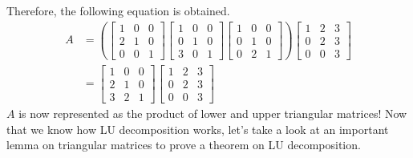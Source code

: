 \documentclass[../main.tex]{subfiles}
\begin{document}
Therefore, the following equation is obtained.
\begin{align*}
    A
    &=
    \left(
    \begin{bmatrix}
        1 & 0 & 0 \\
        2 & 1 & 0 \\
        0 & 0 & 1
    \end{bmatrix}
    \begin{bmatrix}
        1 & 0 & 0 \\
        0 & 1 & 0 \\
        3 & 0 & 1
    \end{bmatrix}
    \begin{bmatrix}
        1 & 0 & 0 \\
        0 & 1 & 0 \\
        0 & 2 & 1
    \end{bmatrix}
    \right)
    \begin{bmatrix}
        1 & 2 & 3 \\
        0 & 2 & 3 \\
        0 & 0 & 3
    \end{bmatrix} \\
    &=
    \begin{bmatrix}
        1 & 0 & 0 \\
        2 & 1 & 0 \\
        3 & 2 & 1
    \end{bmatrix}
    \begin{bmatrix}
        1 & 2 & 3 \\
        0 & 2 & 3 \\
        0 & 0 & 3
    \end{bmatrix}
\end{align*}
$A$ is now represented as the product of lower and upper triangular
matrices! Now that we know how LU decomposition works, let's take
a look at an important lemma on triangular matrices to prove a
theorem on LU decomposition.
\end{document}

